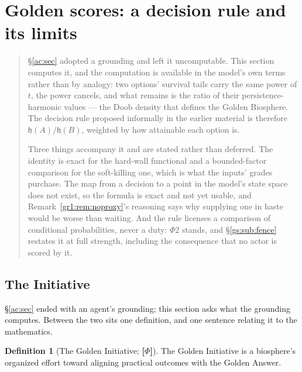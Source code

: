 \documentclass[11pt]{article}
\numberwithin{equation}{section}
\theoremstyle{plain}
\theoremstyle{definition}
\newtheorem{definition}[theorem]{Definition}
\theoremstyle{remark}
\newcommand{\hm}{\mathfrak{h}}
\begin{document}

\section{Golden scores: a decision rule and its limits}\label{gs:sec}

\begin{quote}\small
\S\ref{ac:sec} adopted a grounding and left it uncomputable. This section
computes it, and the computation is available in the model's own terms
rather than by analogy: two options' survival tails carry the same power
of $t$, the power cancels, and what remains is the ratio of their
persistence-harmonic values --- the Doob density that defines the Golden
Biosphere. The decision rule proposed informally in the earlier material
is therefore $\hm(A)/\hm(B)$, weighted by how attainable each option is.

Three things accompany it and are stated rather than deferred. The
identity is exact for the hard-wall functional and a bounded-factor
comparison for the soft-killing one, which is what the inputs' grades
purchase. The map from a decision to a point in the model's state space
does not exist, so the formula is exact and not yet usable, and
Remark~\ref{gr1:rem:noproxy}'s reasoning says why supplying one in haste would
be worse than waiting. And the rule licenses a comparison of conditional
probabilities, never a duty: $\Phi2$ stands, and \S\ref{gs:sub:fence}
restates it at full strength, including the consequence that no actor is
scored by it.
\end{quote}

\subsection{The Initiative}\label{gs:sub:initiative}

\S\ref{ac:sec} ended with an agent's grounding; this section asks what the grounding computes. Between the two sits one definition, and one sentence relating it to the mathematics.

\begin{definition}[The Golden Initiative; \textbf{[$\Phi$]}]\label{gs:def:initiative}
The Golden Initiative is a biosphere's organized effort toward aligning practical outcomes with the Golden Answer.
\end{definition}
\end{document}
